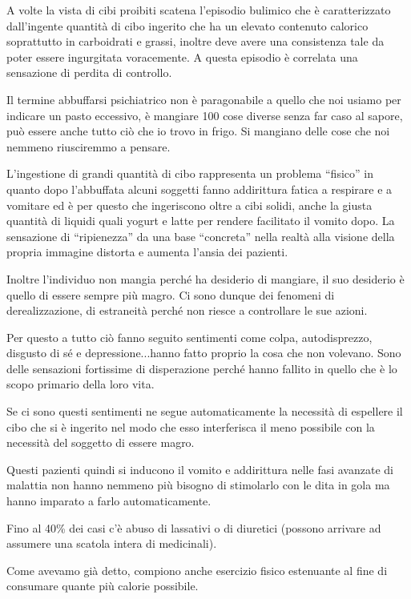 A volte la vista di cibi proibiti scatena l'episodio bulimico che è
caratterizzato dall'ingente quantità di cibo ingerito che ha un elevato
contenuto calorico soprattutto in carboidrati e grassi, inoltre deve
avere una consistenza tale da poter essere ingurgitata voracemente. A
questa episodio è correlata una sensazione di perdita di controllo.

Il termine abbuffarsi psichiatrico non è paragonabile a quello che noi
usiamo per indicare un pasto eccessivo, è mangiare 100 cose diverse
senza far caso al sapore, può essere anche tutto ciò che io trovo in
frigo. Si mangiano delle cose che noi nemmeno riusciremmo a pensare.

L'ingestione di grandi quantità di cibo rappresenta un problema
``fisico'' in quanto dopo l'abbuffata alcuni soggetti fanno addirittura
fatica a respirare e a vomitare ed è per questo che ingeriscono oltre a
cibi solidi, anche la giusta quantità di liquidi quali yogurt e latte
per rendere facilitato il vomito dopo. La sensazione di ``ripienezza''
da una base ``concreta'' nella realtà alla visione della propria
immagine distorta e aumenta l'ansia dei pazienti.

Inoltre l'individuo non mangia perché ha desiderio di mangiare, il suo
desiderio è quello di essere sempre più magro. Ci sono dunque dei
fenomeni di derealizzazione, di estraneità perché non riesce a
controllare le sue azioni.

Per questo a tutto ciò fanno seguito sentimenti come colpa,
autodisprezzo, disgusto di sé e depressione...hanno fatto proprio la
cosa che non volevano. Sono delle sensazioni fortissime di disperazione
perché hanno fallito in quello che è lo scopo primario della loro vita.

Se ci sono questi sentimenti ne segue automaticamente la necessità di
espellere il cibo che si è ingerito nel modo che esso interferisca il
meno possibile con la necessità del soggetto di essere magro.

Questi pazienti quindi si inducono il vomito e addirittura nelle fasi
avanzate di malattia non hanno nemmeno più bisogno di stimolarlo con le
dita in gola ma hanno imparato a farlo automaticamente.

Fino al 40\% dei casi c'è abuso di lassativi o di diuretici (possono
arrivare ad assumere una scatola intera di medicinali).

Come avevamo già detto, compiono anche esercizio fisico estenuante al
fine di consumare quante più calorie possibile.

